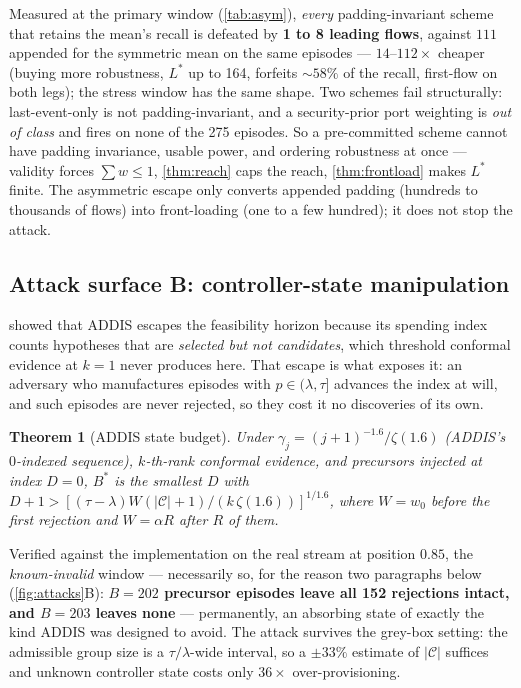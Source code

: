 \documentclass[conference]{IEEEtran}
\newtheorem{theorem}{Theorem}
\newcommand{\Cal}{\mathcal{C}}
\newcommand{\nCal}{\lvert\Cal\rvert}
\begin{document}
Measured at the primary window (\cref{tab:asym}), \emph{every} padding-invariant scheme that retains
the mean's recall is defeated by \textbf{1 to 8 leading flows}, against $111$ appended for the symmetric
mean on the same episodes --- $14$--$112\times$ cheaper (buying more robustness, $L^{*}$ up to 164,
forfeits $\sim\!58\%$ of the recall, first-flow on both legs); the stress window has the same shape. Two schemes fail
structurally: last-event-only is not padding-invariant, and a security-prior port weighting is
\emph{out of class} and fires on none of the 275 episodes. So a pre-committed scheme cannot have
padding invariance, usable power, and ordering robustness at once --- validity forces $\sum w\le1$,
\cref{thm:reach} caps the reach, \cref{thm:frontload} makes $L^{*}$ finite. The asymmetric escape only
converts appended padding (hundreds to thousands of flows) into front-loading (one to a few hundred);
it does not stop the attack.

\subsection{Attack surface B: controller-state manipulation}\label{sec:state}

 showed that ADDIS escapes the feasibility horizon because its spending index
counts hypotheses that are \emph{selected but not candidates}, which threshold conformal evidence at
$k=1$ never produces here. That escape is what exposes it: an adversary who manufactures
episodes with $p \in (\lambda, \tau]$ advances the index at will, and such episodes are never
rejected, so they cost it no discoveries of its own.

\begin{theorem}[ADDIS state budget]\label{thm:addis}
Under $\gamma_j = (j+1)^{-1.6}/\zeta(1.6)$ (ADDIS's $0$-indexed sequence), $k$-th-rank conformal
evidence, and precursors injected at index $D=0$, $B^{*}$ is the smallest $D$ with
$D + 1 > \left[(\tau-\lambda)W(\nCal+1)/(k\,\zeta(1.6))\right]^{1/1.6}$, where $W = w_0$ before
the first rejection and $W = \alpha R$ after $R$ of them.
\end{theorem}

Verified against the implementation on the real stream at position $0.85$, the
\emph{known-invalid} window --- necessarily so, for the reason two paragraphs below
(\cref{fig:attacks}B): \textbf{$B = 202$
precursor episodes leave all 152 rejections intact, and $B = 203$ leaves none} --- permanently, an
absorbing state of exactly the kind ADDIS was designed to avoid. The attack survives the
grey-box setting: the admissible group size is a $\tau/\lambda$-wide interval, so a
$\pm 33\%$ estimate of $\nCal$ suffices and unknown controller state costs only $36\times$
over-provisioning.
\end{document}
